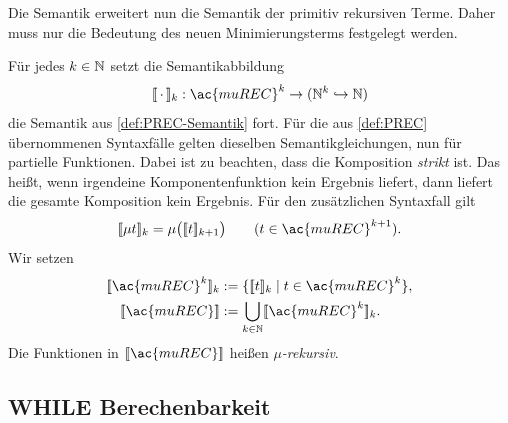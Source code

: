 Die Semantik erweitert nun die Semantik der primitiv rekursiven Terme. Daher
muss nur die Bedeutung des neuen Minimierungsterms festgelegt werden.
\begin{Def}[name={Semantik der \acs*{muREC}}]\label{def:muREC-Semantik}
  Für jedes $k\in\mathbb{N}$ setzt die Semantikabbildung
  \[
    \llbracket\,\cdot\,\rrbracket_k:
    \ac{muREC}^k\to(\N^k\hookrightarrow\N)
  \]
  die Semantik aus \autoref{def:PREC-Semantik} fort. Für die aus
  \autoref{def:PREC} übernommenen Syntaxfälle gelten dieselben
  Semantikgleichungen, nun für partielle Funktionen. Dabei ist zu
  beachten, dass die Komposition \emph{strikt} ist. Das heißt, wenn
  irgendeine Komponentenfunktion kein Ergebnis liefert, dann liefert
  die gesamte Komposition kein Ergebnis. Für den zusätzlichen
  Syntaxfall gilt
  \[
    \llbracket\mu t\rrbracket_k
    =\mu\bigl(\llbracket t\rrbracket_{k+1}\bigr)
    \qquad(t\in\ac{muREC}^{k+1}).
  \]
  Wir setzen
  \begin{align*}
    \llbracket\ac{muREC}^k\rrbracket_k
      &:=\{\llbracket t\rrbracket_k\mid t\in\ac{muREC}^k\},\\
    \llbracket\ac{muREC}\rrbracket
      &:=\bigcup_{k\in\N}\llbracket\ac{muREC}^k\rrbracket_k.
  \end{align*}
  Die Funktionen in $\llbracket\ac{muREC}\rrbracket$ heißen
  \emph{$\mu$-rekursiv}.
\end{Def}

\subsection{WHILE Berechenbarkeit}
\label{sec:while-berech}


